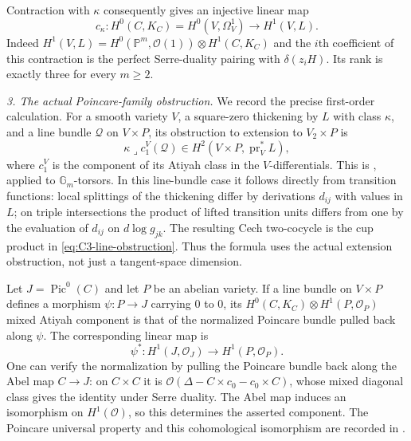 Contraction with $\kappa$ consequently gives an
injective linear map
\begin{equation}\label{eq:C3-KS-full-rank}
 c_\kappa:H^0(C,K_C)
       =H^0(V,\Omega_V^1)
       \longrightarrow H^1(V,L).
\end{equation}
Indeed $H^1(V,L)=H^0(\mathbb P^m,\mathcal O(1))
\otimes H^1(C,K_C)$ and the $i$th coefficient
of this contraction is the perfect Serre-duality
pairing with $\delta(z_iH)$. Its rank is exactly
three for every $m\ge2$.

\emph{3. The actual Poincare-family obstruction.}
We record the precise first-order calculation.
For a smooth variety $V$, a square-zero thickening
by $L$ with class $\kappa$, and a line bundle
$\mathcal Q$ on $V\times P$, its obstruction to
extension to $V_2\times P$ is
\begin{equation}\label{eq:C3-line-obstruction}
        \kappa\mathbin{\lrcorner}c_1^{V}(\mathcal Q)
                   \in H^2(V\times P,\operatorname{pr}_V^*L),
\end{equation}
where $c_1^{V}$ is the component of its Atiyah
class in the $V$-differentials. This is
\citet[Theorem 2.6 and formula (2.7.2),
pp.~166--167]{D_Illusie1972Torsors}, applied to
$\mathbb G_m$-torsors. In this line-bundle case
it follows directly from transition functions:
local splittings of the thickening differ by
derivations $d_{ij}$ with values in $L$; on triple
intersections the product of lifted transition
units differs from one by the evaluation of
$d_{ij}$ on $d\log g_{jk}$. The resulting Cech
two-cocycle is the cup product in
\eqref{eq:C3-line-obstruction}. Thus the formula
uses the actual extension obstruction, not just
a tangent-space dimension.

Let $J=\operatorname{Pic}^0(C)$ and let $P$ be an
abelian variety. If a line bundle on $V\times P$
defines a morphism $\psi:P\to J$ carrying $0$ to
$0$, its $H^0(C,K_C)\otimes H^1(P,\mathcal O_P)$
mixed Atiyah component is that of the normalized
Poincare bundle pulled back along $\psi$.
The corresponding linear map is
\[
                  \psi^*:H^1(J,\mathcal O_J)
                                  \longrightarrow H^1(P,\mathcal O_P).
\]
One can verify the normalization by pulling the
Poincare bundle back along the Abel map
$C\to J$: on $C\times C$ it is
$\mathcal O(\Delta-C\times c_0-c_0\times C)$,
whose mixed diagonal class gives the identity
under Serre duality. The Abel map induces an
isomorphism on $H^1(\mathcal O)$, so this
determines the asserted component. The Poincare
universal property and this cohomological
isomorphism are recorded in
\citet[Theorem 1.2 and Lemma 9.5,
pp.~3 and 31--32]{D_MilneJacobians2021}.

